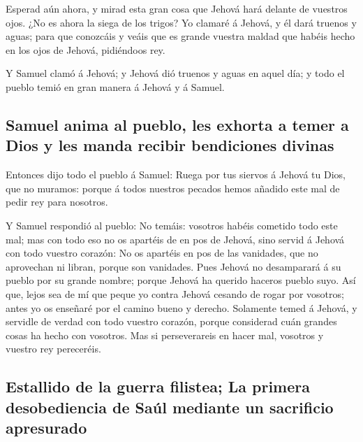  Esperad aún ahora, y mirad esta gran cosa que Jehová hará
delante de vuestros ojos.  ¿No es ahora la siega de los
trigos? Yo clamaré á Jehová, y él dará truenos y aguas; para que
conozcáis y veáis que es grande vuestra maldad que habéis hecho en los
ojos de Jehová, pidiéndoos rey.

 Y Samuel clamó á Jehová; y Jehová dió truenos y aguas en
aquel día; y todo el pueblo temió en gran manera á Jehová y á Samuel.

\hypertarget{samuel-anima-al-pueblo-les-exhorta-a-temer-a-dios-y-les-manda-recibir-bendiciones-divinas}{%
\subsection{Samuel anima al pueblo, les exhorta a temer a Dios y les
manda recibir bendiciones
divinas}\label{samuel-anima-al-pueblo-les-exhorta-a-temer-a-dios-y-les-manda-recibir-bendiciones-divinas}}

 Entonces dijo todo el pueblo á Samuel: Ruega por tus
siervos á Jehová tu Dios, que no muramos: porque á todos nuestros
pecados hemos añadido este mal de pedir rey para nosotros.

 Y Samuel respondió al pueblo: No temáis: vosotros habéis
cometido todo este mal; mas con todo eso no os apartéis de en pos de
Jehová, sino servid á Jehová con todo vuestro corazón:  No
os apartéis en pos de las vanidades, que no aprovechan ni libran, porque
son vanidades.  Pues Jehová no desamparará á su pueblo por
su grande nombre; porque Jehová ha querido haceros pueblo suyo.
 Así que, lejos sea de mí que peque yo contra Jehová
cesando de rogar por vosotros; antes yo os enseñaré por el camino bueno
y derecho.  Solamente temed á Jehová, y servidle de verdad
con todo vuestro corazón, porque considerad cuán grandes cosas ha hecho
con vosotros.  Mas si perseverareis en hacer mal, vosotros
y vuestro rey pereceréis.

\hypertarget{estallido-de-la-guerra-filistea-la-primera-desobediencia-de-sauxfal-mediante-un-sacrificio-apresurado}{%
\subsection{Estallido de la guerra filistea; La primera desobediencia de
Saúl mediante un sacrificio
apresurado}\label{estallido-de-la-guerra-filistea-la-primera-desobediencia-de-sauxfal-mediante-un-sacrificio-apresurado}}

